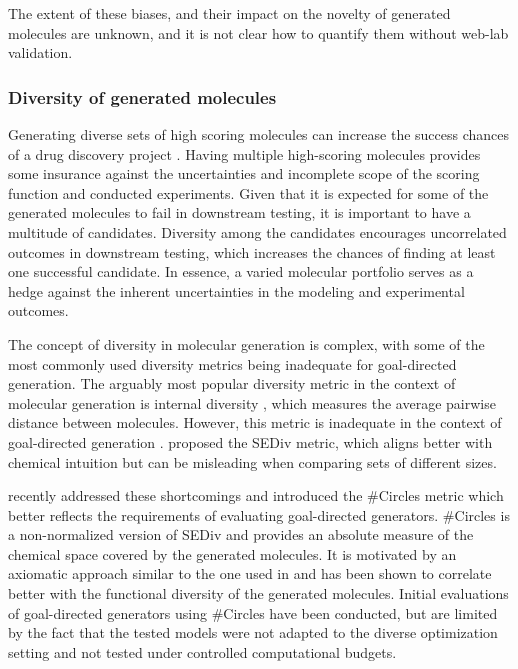 The extent of these biases, and their impact on the novelty of generated molecules are unknown, and it is
not clear how to quantify them without web-lab validation.

\subsubsection{Diversity of generated molecules}
Generating diverse sets of high scoring molecules can increase the success chances of a drug
discovery project
\citep{martinDiverseViewpointsComputational2001,gorseDiversityMedicinalChemistry2006}. Having
multiple high-scoring molecules provides some insurance against the uncertainties and incomplete
scope of the scoring function and conducted experiments. Given that it is expected for some of
the generated molecules to fail in downstream testing, it is important to have a multitude of
candidates. Diversity among the candidates encourages uncorrelated outcomes in downstream testing, which
increases the chances of finding at least one successful candidate. In essence, a varied molecular
portfolio serves as a hedge against the inherent uncertainties in the modeling and experimental
outcomes.

The concept of diversity in molecular generation is complex, with some of the most commonly used
diversity metrics being inadequate for goal-directed generation. The arguably most popular diversity
metric in the context of molecular generation is internal diversity
\citep{benhendaChemGANChallengeDrug2017}, which measures the average pairwise distance between
molecules. However, this metric is inadequate in the context of goal-directed generation
\citep{waldmanNovelAlgorithmsOptimization2000,xieMARSMarkovMolecular2021,thomasComparisonStructureLigandbased2021}.
\citet{thomasComparisonStructureLigandbased2021} proposed the \ac{SEDiv} metric, which aligns better
with chemical intuition but can be misleading when comparing sets of different sizes.

\citet{xieHowMuchSpace2023} recently addressed these shortcomings and introduced the \#Circles
metric which better reflects the requirements of evaluating goal-directed generators. \#Circles is a
non-normalized version of \ac{SEDiv} and provides an absolute measure of the chemical space covered
by the generated molecules. It is motivated by an axiomatic approach similar to the one used in
\citep{waldmanNovelAlgorithmsOptimization2000} and has been shown to correlate better with the
functional diversity of the generated molecules. Initial evaluations of goal-directed
generators using \#Circles have been conducted, but are limited by the fact
that the tested models were not adapted to the diverse optimization setting and not
tested under controlled computational budgets.

